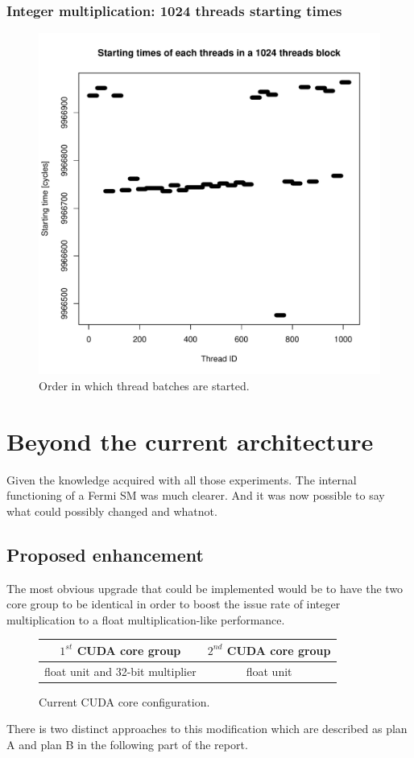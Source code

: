 \documentclass{report}
\def \scalingfactor{.8}
\begin{document}
	\subsection{Integer multiplication: 1024 threads starting times}
    \begin{figure}[H]
    		\centering
	    	\includegraphics[width=\scalingfactor\linewidth]{"graphics/starting_times_ratio31"}
	    	\vspace{-15pt}
	    	\captionsetup{justification=centering}    
	    	\caption{Order in which thread batches are started.}
    \end{figure}
\chapter{Beyond the current architecture}
    Given the knowledge acquired with all those experiments. The internal functioning of a Fermi SM was much clearer. And it was now possible to say what could possibly changed and whatnot.
   \section{Proposed enhancement}
   The most obvious upgrade that could be implemented would be to have the two core group to be identical in order to boost the issue rate of integer multiplication to a float multiplication-like performance.
   \begin{figure}[H]
      \centering
       \begin{tabular}{ | c | c | }
    	    \hline
    	    $1^{st}$ CUDA core group & $2^{nd}$ CUDA core group \\ \hline
    	   float unit and 32-bit multiplier & float unit \\ \hline
  	\end{tabular}
  	\captionsetup{justification=centering}
  	\caption{Current CUDA core configuration.}
  	\label{fig:current_cores}
   \end{figure}
   There is two distinct approaches to this modification which are described as plan A and plan B in the following part of the report.
\end{document}
